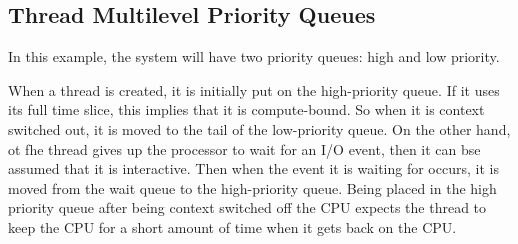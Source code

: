 \subsection*{Thread Multilevel Priority Queues}
In this example, the system will have two priority queues: high and low priority.

When a thread is created, it is initially put on the high-priority queue. If it uses its full time slice, this implies that it is compute-bound. So when it is context switched out, it is moved to the tail of the low-priority queue. On the other hand, ot fhe thread gives up the processor to wait for an I/O event, then it can bse assumed that it is interactive. Then when the event it is waiting for occurs, it is moved from the wait queue to the high-priority queue. Being placed in the high priority queue after being context switched off the CPU expects the thread to keep the CPU for a short amount of time when it gets back on the CPU. 